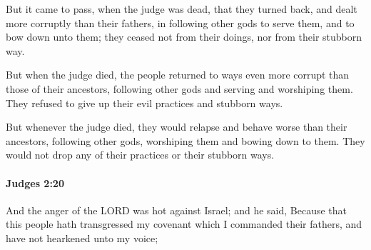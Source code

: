 			\begin{versebox}
					\item[BHS] 
					\item[ASV] But it came to pass, when the judge was dead, that they turned back, and dealt more corruptly than their fathers, in following other gods to serve them, and to bow down unto them; they ceased not from their doings, nor from their stubborn way.
					\item[NIV] But when the judge died, the people returned to ways even more corrupt than those of their ancestors, following other gods and serving and worshiping them. They refused to give up their evil practices and stubborn ways.
					\item[NRSV] But whenever the judge died, they would relapse and behave worse than their ancestors, following other gods, worshiping them and bowing down to them. They would not drop any of their practices or their stubborn ways.
			\end{versebox}

		\paragraph{Judges 2:20} %
			\label{JUDGES-2-20}

			And the anger of the LORD was hot against Israel; and he said, Because that this people hath transgressed my covenant which I commanded their fathers, and have not hearkened unto my voice;

